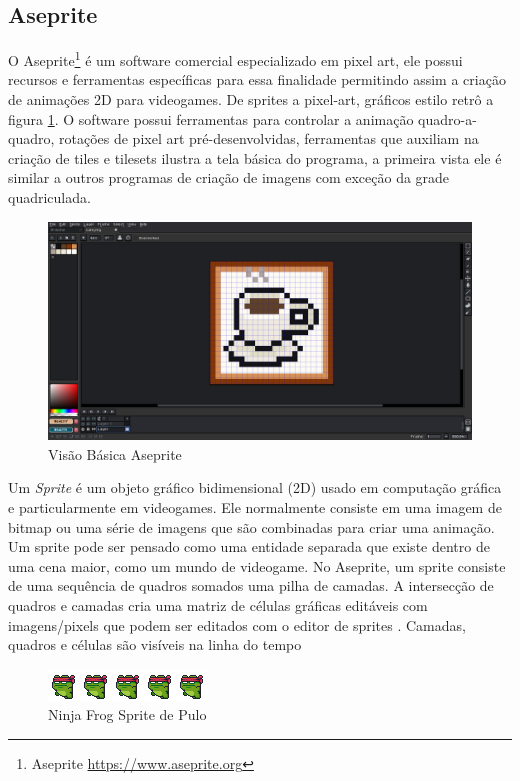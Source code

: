 \subsection{Aseprite}  
\label{sec:aseprite}
O Aseprite\footnote{Aseprite \url{https://www.aseprite.org}} é um software comercial especializado em pixel art, ele possui recursos e ferramentas específicas para essa finalidade permitindo assim a criação de animações 2D para videogames. De sprites a pixel-art, gráficos estilo retrô a figura \ref{fig:aseprite}. O software possui ferramentas para controlar
a animação quadro-a-quadro, rotações de pixel art pré-desenvolvidas, ferramentas que auxiliam na criação de tiles e tilesets
ilustra a tela básica do programa, a primeira vista ele é similar a outros programas de criação de imagens com exceção da grade quadriculada.  
\begin{figure}[ht!]
    \centering
    \includegraphics[width=1\linewidth]{figuras/aseprite.jpg}
    \caption{Visão Básica Aseprite}
    \label{fig:aseprite}
\end{figure}

Um \textit{Sprite} é um objeto gráfico bidimensional (2D) usado em computação gráfica e particularmente em videogames. Ele normalmente consiste em uma imagem de bitmap ou uma série de imagens que são combinadas para criar uma animação. Um sprite pode ser pensado como uma entidade separada que existe dentro de uma cena maior, como um mundo de videogame. No Aseprite, um sprite consiste de uma sequência de quadros somados uma pilha de camadas. A intersecção de quadros e camadas cria uma matriz de células gráficas editáveis com imagens/pixels que podem ser editados com o editor de sprites . Camadas, quadros e células são visíveis na linha do tempo
\begin{figure}[h!]
    \centering
    \includegraphics[width=1\linewidth]{figuras/sprite-frog.png}
    \caption{Ninja Frog Sprite de Pulo}
    \label{fig:enter-label}
\end{figure}
